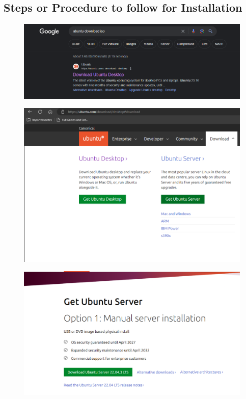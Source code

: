 \documentclass[11pt]{article}
\begin{document}
\subsection{Steps or Procedure to follow for Installation}

\begin{figure}[H]
    \centering
    \includegraphics[width=.95\textwidth]{screenshots/1.png}
    \caption{}
\end{figure}
\begin{figure}[H]
    \centering
    \includegraphics[width=.95\textwidth]{screenshots/2.png}
    \caption{}
\end{figure}
\begin{figure}[H]
    \centering
    \includegraphics[width=.95\textwidth]{screenshots/3.png}
    \caption{}
\end{figure}
\end{document}
